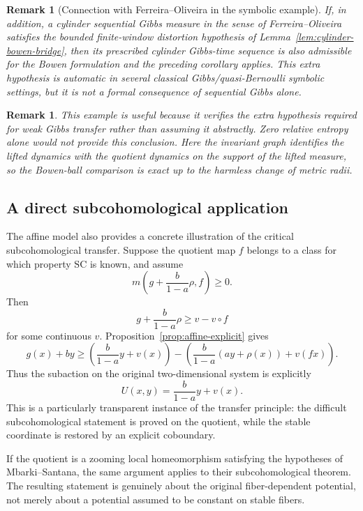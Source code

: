 \documentclass[11pt,a4paper]{article}
\newtheorem{remark}[theorem]{Remark}
\begin{document}
\begin{remark}[Connection with Ferreira--Oliveira in the symbolic example]
If, in addition, a cylinder sequential Gibbs measure in the sense of
Ferreira--Oliveira satisfies the bounded finite-window distortion hypothesis of
Lemma~\ref{lem:cylinder-bowen-bridge}, then its prescribed cylinder Gibbs-time
sequence is also admissible for the Bowen formulation and the preceding
corollary applies. This extra hypothesis is automatic in several classical
Gibbs/quasi-Bernoulli symbolic settings, but it is not a formal consequence of
sequential Gibbs alone.
\end{remark}

\begin{remark}
This example is useful because it verifies the extra hypothesis required
for weak Gibbs transfer rather than assuming it abstractly. Zero relative
entropy alone would not provide this conclusion. Here the invariant graph
identifies the lifted dynamics with the quotient dynamics on the support of
the lifted measure, so the Bowen-ball comparison is exact up to the harmless
change of metric radii.
\end{remark}

\subsection{A direct subcohomological application}

The affine model also provides a concrete illustration of the critical
subcohomological transfer. Suppose the quotient map $f$ belongs to a class
for which property $\mathrm{SC}$ is known, and assume
\[
m\!\left(g+\frac{b}{1-a}\rho,f\right)\ge0.
\]
Then
\[
g+\frac{b}{1-a}\rho\ge v-v\circ f
\]
for some continuous $v$. Proposition~\ref{prop:affine-explicit} gives
\[
g(x)+by
\ge
\left(
\frac{b}{1-a}y+v(x)
\right)
-
\left(
\frac{b}{1-a}(ay+\rho(x))+v(fx)
\right).
\]
Thus the subaction on the original two-dimensional system is explicitly
\[
U(x,y)=\frac{b}{1-a}y+v(x).
\]
This is a particularly transparent instance of the transfer principle:
the difficult subcohomological statement is proved on the quotient, while
the stable coordinate is restored by an explicit coboundary.

If the quotient is a zooming local homeomorphism satisfying the hypotheses
of Mbarki--Santana, the same argument applies to their subcohomological
theorem. The resulting statement is genuinely about the original
fiber-dependent potential, not merely about a potential assumed to be
constant on stable fibers.
\end{document}
